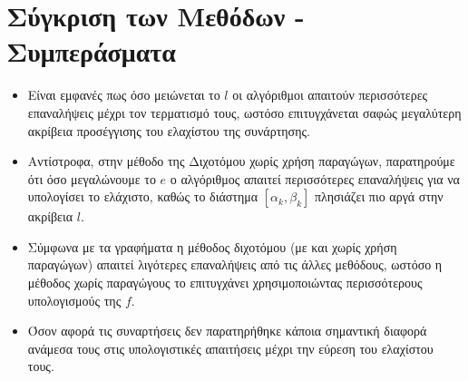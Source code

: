 \chapter{Σύγκριση των Μεθόδων - Συμπεράσματα}
\label{ch:chapter4}

\begin{itemize}
    \item Είναι εμφανές πως όσο μειώνεται το $l$ οι αλγόριθμοι απαιτούν περισσότερες επαναλήψεις μέχρι τον τερματισμό τους, ωστόσο επιτυγχάνεται σαφώς μεγαλύτερη ακρίβεια προσέγγισης του ελαχίστου της συνάρτησης.
    \item Αντίστροφα, στην μέθοδο της Διχοτόμου χωρίς χρήση παραγώγων, παρατηρούμε ότι όσο μεγαλώνουμε το $e$ ο αλγόριθμος απαιτεί περισσότερες επαναλήψεις για να υπολογίσει το ελάχιστο, καθώς το διάστημα $[\alpha_k , \beta_k]$ πλησιάζει πιο αργά στην ακρίβεια $l$.
    \item Σύμφωνα με τα γραφήματα η μέθοδος διχοτόμου (με και χωρίς χρήση παραγώγων) απαιτεί λιγότερες επαναλήψεις από τις άλλες μεθόδους, ωστόσο η μέθοδος χωρίς παραγώγους το επιτυγχάνει χρησιμοποιώντας περισσότερους υπολογισμούς της $f$.
    \item Όσον αφορά τις συναρτήσεις δεν παρατηρήθηκε κάποια σημαντική διαφορά ανάμεσα τους στις υπολογιστικές απαιτήσεις μέχρι την εύρεση του ελαχίστου τους.
\end{itemize}


